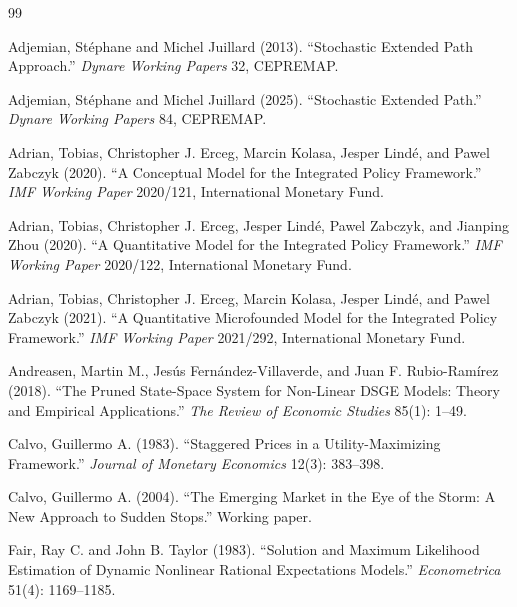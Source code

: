 \documentclass[12pt]{article}
\begin{document}
\begin{thebibliography}{99}

Adjemian, Stéphane and Michel Juillard (2013).
\newblock ``Stochastic Extended Path Approach.''
\newblock \textit{Dynare Working Papers} 32, CEPREMAP.

Adjemian, Stéphane and Michel Juillard (2025).
\newblock ``Stochastic Extended Path.''
\newblock \textit{Dynare Working Papers} 84, CEPREMAP.

Adrian, Tobias, Christopher J. Erceg, Marcin Kolasa, Jesper Lindé, and Pawel Zabczyk (2020).
\newblock ``A Conceptual Model for the Integrated Policy Framework.''
\newblock \textit{IMF Working Paper} 2020/121, International Monetary Fund.

Adrian, Tobias, Christopher J. Erceg, Jesper Lindé, Pawel Zabczyk, and Jianping Zhou (2020).
\newblock ``A Quantitative Model for the Integrated Policy Framework.''
\newblock \textit{IMF Working Paper} 2020/122, International Monetary Fund.

Adrian, Tobias, Christopher J. Erceg, Marcin Kolasa, Jesper Lindé, and Pawel Zabczyk (2021).
\newblock ``A Quantitative Microfounded Model for the Integrated Policy Framework.''
\newblock \textit{IMF Working Paper} 2021/292, International Monetary Fund.

Andreasen, Martin M., Jesús Fernández-Villaverde, and Juan F. Rubio-Ramírez (2018).
\newblock ``The Pruned State-Space System for Non-Linear DSGE Models: Theory and Empirical Applications.''
\newblock \textit{The Review of Economic Studies} 85(1): 1--49.

Calvo, Guillermo A. (1983).
\newblock ``Staggered Prices in a Utility-Maximizing Framework.''
\newblock \textit{Journal of Monetary Economics} 12(3): 383--398.

Calvo, Guillermo A. (2004).
\newblock ``The Emerging Market in the Eye of the Storm: A New Approach to Sudden Stops.''
\newblock Working paper.

Fair, Ray C. and John B. Taylor (1983).
\newblock ``Solution and Maximum Likelihood Estimation of Dynamic Nonlinear Rational Expectations Models.''
\newblock \textit{Econometrica} 51(4): 1169--1185.


\end{thebibliography}
\end{document}
